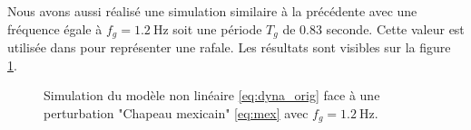 Nous avons aussi réalisé une simulation similaire à la précédente avec une fréquence égale à $f_g = \SI{1.2}{\Hz}$ soit une période $T_g$ de 0.83 seconde. Cette valeur est utilisée dans \cite{Gillebaart2014} pour représenter une rafale. Les résultats sont visibles sur la figure \ref{fig:sim_mex1_2}.
\begin{figure}[h]
    \centering
    \caption{Simulation du modèle non linéaire \eqref{eq:dyna_orig} face à une perturbation "Chapeau mexicain" \eqref{eq:mex} avec $f_g = \SI{1.2}{\Hz}$.}
    \label{fig:sim_mex1_2}
\end{figure}


